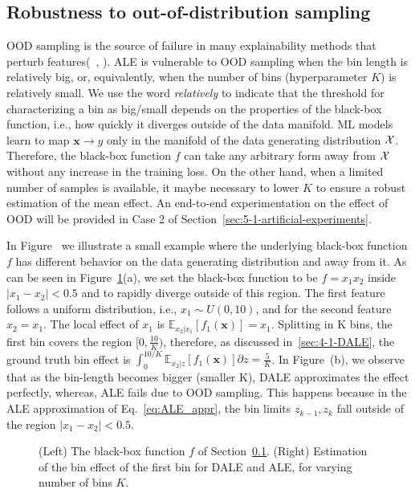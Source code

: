 \documentclass[wcp]{jmlr}
\newcommand{\xb}{\mathbf{x}} \newcommand{\R}{\mathbb{R}}
\newcommand{\E}{\mathbb{E}} \newcommand{\Jac}{\mathbf{J}}
\begin{document}
\subsection{Robustness to out-of-distribution sampling}
\label{sec:4-3-robustness}
OOD sampling is the source of failure in many explainability methods
that perturb features(~\cite{Baniecki2022}, \cite{Hooker2021}). ALE is
vulnerable to OOD sampling when the bin length is relatively big, or,
equivalently, when the number of bins (hyperparameter \(K\)) is
relatively small. We use the word \textit{relatively} to indicate that
the threshold for characterizing a bin as big/small depends on the
properties of the black-box function, i.e., how quickly it diverges
outside of the data manifold. ML models learn to map
\( \xb \rightarrow y \) only in the manifold of the data generating
distribution \(\mathcal{X}\). Therefore, the black-box function \(f\) can take
any arbitrary form away from \(\mathcal{X}\) without any increase in the
training loss. On the other hand, when a limited number of samples is
available, it maybe necessary to lower \(K\) to ensure a robust
estimation of the mean effect. An end-to-end experimentation on the
effect of OOD will be provided in Case 2 of
Section~\ref{sec:5-1-artificial-experiments}.


In Figure~ we illustrate a small
example where the underlying black-box function \(f\) has different
behavior on the data generating distribution and away from it. As can
be seen in Figure~\ref{fig:example-different-bins}(a), we set the
black-box function to be \(f = x_1x_2\) inside \(|x_1-x_2| < 0.5\) and
to rapidly diverge outside of this region. The first feature follows a
uniform distribution, i.e., \(x_1 \sim U(0,10)\), and for the second
feature \(x_2=x_1\). The local effect of \(x_1\) is
\(\E_{x_2|x_1} \left [ f_1(\xb) \right ] = x_1 \). Splitting in K bins,
the first bin covers the region \( [0, \frac{10}{K} ) \), therefore,
as discussed in~\ref{sec:4-1-DALE}, the ground truth bin effect is
\(\int_0^{10/K} \E_{x_2|z}\left[f_1(\xb)\right]\partial z =
\frac{5}{K}\). In Figure~(b), we
observe that as the bin-length becomes bigger (smaller K), DALE
approximates the effect perfectly, whereas, ALE fails due to OOD
sampling. This happens because in the ALE approximation of
Eq.~\eqref{eq:ALE_appr}, the bin limits \(z_{k-1}, z_k\) fall outside
of the region \(|x_1-x_2| < 0.5\).

\begin{figure}[h]
  \centering
  \resizebox{.35\columnwidth}{!}{}
  \resizebox{.35\columnwidth}{!}{}
  \caption[Example comparison]{(Left) The black-box function \(f\) of
    Section~\ref{sec:4-3-robustness}. (Right) Estimation of the bin
    effect of the first bin for DALE and ALE, for varying number of
    bins \(K\).}
  \label{fig:example-different-bins}
\end{figure}
\end{document}
